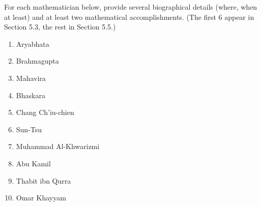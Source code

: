 \documentclass[12pt]{article}
\begin{document}
 For each mathematician below, provide several biographical details (where, when at least) and at least two mathematical accomplishments. (The first 6 appear in Section 5.3, the rest in Section 5.5.)
 \begin{enumerate}
 \item Aryabhata
 \vfill
 \item Brahmagupta
 \vfill
 \item Mahavira
 \vfill
 \item Bhaskara
 \vfill
 \item Chang Ch'iu-chien
 \vfill
 \item Sun-Tsu
 \vfill
 \item Muhammad Al-Khwarizmi
 \vfill
 \item Abu Kamil
 \vfill
 \item Thabit ibn Qurra
 \vfill
 \item Omar Khayyam
 \vfill
 \end{enumerate}
\end{document}
